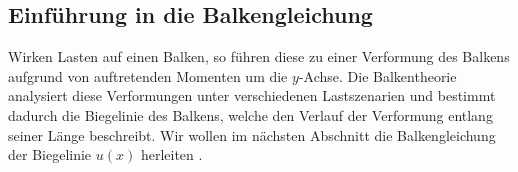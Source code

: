 \subsection{Einführung in die Balkengleichung}
Wirken Lasten auf einen Balken, so führen diese zu einer Verformung des Balkens aufgrund von auftretenden Momenten um die $y$-Achse.
Die Balkentheorie analysiert diese Verformungen unter verschiedenen Lastszenarien und bestimmt dadurch die Biegelinie des Balkens, welche den Verlauf der Verformung entlang seiner Länge beschreibt.
Wir wollen im nächsten Abschnitt die Balkengleichung der Biegelinie $u(x)$ herleiten \cite{balken:Balkentheorie}.

